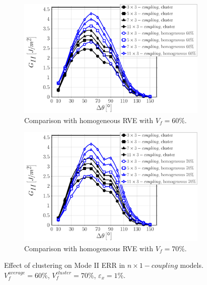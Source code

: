 \documentclass[review]{elsarticle}
\begin{document}
\begin{figure}[!h]
\centering
    \begin{subfigure}[b]{0.475\textwidth}
        \includegraphics[width=\textwidth]{nx1-coupling-vf60-GII.pdf}
        \caption{Comparison with homogeneous RVE with $V_{f}=60\%$.}\label{subfig:clusterCouplingModeII60}
    \end{subfigure}\quad
    \begin{subfigure}[b]{0.475\textwidth}
        \includegraphics[width=\textwidth]{nx1-coupling-vf70-GII.pdf}
        \caption{Comparison with homogeneous RVE with $V_{f}=70\%$.}\label{subfig:clusterCouplingModeII70}
    \end{subfigure}

\caption{Effect of clustering on Mode II ERR in $n\times 1-coupling$ models. $V^{average}_{f}=60\%$, $V^{cluster}_{f}=70\%$, $\varepsilon_{x}=1\%$.}\label{fig:clusterCouplingModeII}
\end{figure}
\end{document}
